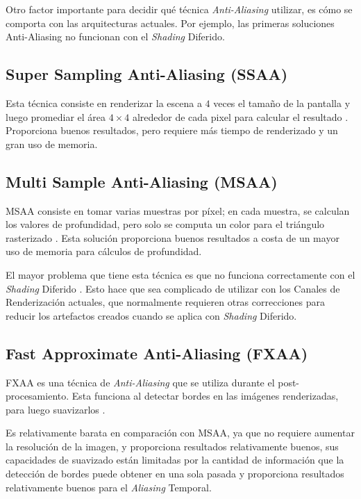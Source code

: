 \documentclass[pregrado]{tesis-usb} %
\begin{document}
Otro factor importante para decidir qué técnica \textit{Anti-Aliasing} utilizar,  es cómo se comporta con las arquitecturas actuales. Por ejemplo, las primeras  soluciones Anti-Aliasing no funcionan con el \textit{Shading} Diferido.


\subsection{Super Sampling Anti-Aliasing (SSAA)}
Esta técnica consiste en renderizar la escena a $4$ veces el tamaño de la pantalla y luego promediar el área $4\times 4$ alrededor de cada pixel para calcular el resultado \cite{Doggett2017EDAN35}. Proporciona buenos resultados, pero requiere más tiempo de renderizado y un gran uso de memoria.

\subsection{Multi Sample Anti-Aliasing (MSAA)}
MSAA consiste en tomar varias muestras por píxel; en cada muestra, se calculan los valores de profundidad, pero solo se computa un color para el triángulo rasterizado \cite{Doggett2017EDAN35}. Esta solución proporciona buenos resultados a costa de un mayor uso de memoria para cálculos de profundidad.

El mayor problema que tiene esta técnica es que no funciona correctamente con el \textit{Shading} Diferido \cite{Doggett2017EDAN35}. Esto hace que sea complicado de utilizar con los Canales de Renderización actuales, que normalmente requieren otras correcciones para reducir los artefactos creados cuando se aplica con \textit{Shading} Diferido.


\subsection{Fast Approximate Anti-Aliasing (FXAA)}
FXAA es una técnica de \textit{Anti-Aliasing} que se utiliza durante el post-procesamiento. Esta funciona al detectar bordes en las imágenes renderizadas, para luego suavizarlos \cite{Lottes2009}.

Es relativamente barata en comparación con MSAA, ya que no requiere aumentar la resolución de la imagen, y proporciona resultados relativamente buenos, sus capacidades de suavizado están limitadas por la cantidad de información que la detección de bordes puede obtener en una sola pasada y proporciona resultados relativamente buenos para el \textit{Aliasing} Temporal.
\end{document}
